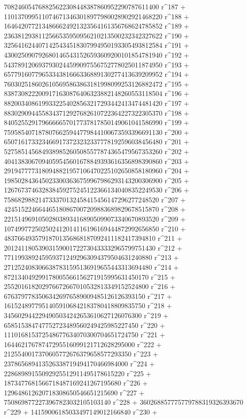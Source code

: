        708246054768825622308448387860952290787611400 r^187 + 
       1101370995110746713463018977980028902921468220 r^188 + 
       1646420772134866624921323564161356768624785852 r^189 + 
       2363812938112566535950956210213500232342327622 r^190 + 
       3256416244071425434518307994950193305493812584 r^191 + 
       4300250907926801465431526593609200101854781940 r^192 + 
       5437891206937930244599097556752778025011874950 r^193 + 
       6577916077965334381666336889130277413639209952 r^194 + 
       7603025186026105695863863181998099253126882472 r^195 + 
       8387308222009171630876406323882148260553118504 r^196 + 
       8820034086199332254028563217293442413474481420 r^197 + 
       8830290944558343712927682610722364227322305370 r^198 + 
       8405255291796666657017737817850149061041586990 r^199 + 
       7595854071878076625944779844100673593396691130 r^200 + 
       6507161733234669173723232337778192596038456480 r^201 + 
       5275851456849389852605085577874365479567353260 r^202 + 
       4041383067094059545601678849393616356898390860 r^203 + 
       2919477773180948821957106470225102650858180960 r^204 + 
       1985028436450233003636759967986293143200306900 r^205 + 
       1267673746328384592752451223661340408352249530 r^206 + 
       758682988214733370132458415456147296277248520 r^207 + 
       424515224664465180867007209883689829678515870 r^208 + 
       221514969105028038934168905099073340670893520 r^209 + 
       107499772502502412014116196169444872992656850 r^210 + 
       48376649357918701356868187092411182417394810 r^211 + 
       20124118053903159001722730433332965799751430 r^212 + 
       7711993892459593712492963094379504631240880 r^213 + 
       2712524083066387831595136919655443313694480 r^214 + 
       872134049299178005566156271915995631450170 r^215 + 
       255201618202976672667010532813349152524800 r^216 + 
       67637977835063426976589009485126126393150 r^217 + 
       16152489779514059106842183780418809835750 r^218 + 
       3456029442294905034242653610627126076300 r^219 + 
       658515384747752723489560249425985227450 r^220 + 
       111016815372548677634070300704651724750 r^221 + 
       16446217678747295516099121712628295000 r^222 + 
       2125540017370605772676379658577293350 r^223 + 
       237865689413526338719494170466984000 r^224 + 
       22868989155092925512911495178615220 r^225 + 
       1873477681566718487169241267195680 r^226 + 
       129648612620718308650546651215690 r^227 + 
       7508698772273967823032105103140 r^228 + 
       360268857775779788319326393670 r^229 + 
       14159006185033497149012166840 r^230 + 
